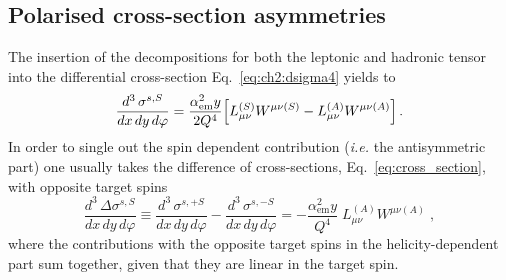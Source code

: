 \subsection{Polarised cross-section asymmetries}
The insertion of the decompositions for both the leptonic and hadronic tensor into the differential cross-section Eq.~\eqref{eq:ch2:dsigma4} yields to 
\begin{equation}
  \frac{d^3 \, \sigma^{s,S}}{dx \, dy \, d\varphi} = \frac{\alpha_{\textrm{em}}^2 y}{2 Q^4} \Bigl[ L^{(S)}_{\mu\nu} W^{\mu\nu(S)} - L^{(A)}_{\mu\nu} W^{\mu\nu(A)}  \Bigr]\,.
  \label{eq:cross_section}
\end{equation}
In order to single out the spin dependent contribution (\textit{i.e.} the antisymmetric part) one usually takes the difference of cross-sections, Eq.~\eqref{eq:cross_section}, with opposite target spins 
\begin{equation}
  \frac{d^3 \, \Delta \sigma^{s,S}}{dx \, dy \, d\varphi} \equiv \frac{d^3 \, \sigma^{s,+S}}{dx \, dy \, d\varphi} - \frac{d^3 \, \sigma^{s,-S}}{dx \, dy \, d\varphi} = - \frac{\alpha_{\textrm{em}}^2 y}{Q^4} \; L^{(A)}_{\mu\nu} W^{\mu\nu(A)} \;,
  \label{eq:diff_cs}
\end{equation}
where the contributions with the opposite target spins in the helicity-dependent part sum together, given that they are linear in the target spin.%

